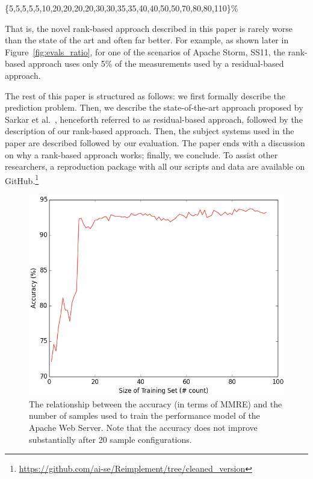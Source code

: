 \begin{center}
\{5,5,5,5,5,10,20,20,20,20,30,30,35,35,40,40,50,50,70,80,80,110\}\%
\end{center}

\noindent
That is, the novel rank-based approach described in this paper is rarely worse than the  state of the art and often far better. For example, as shown later in Figure~\ref{fig:evals_ratio}, for one of the scenarios of Apache Storm, SS11, the rank-based approach uses only 5\% of the measurements used by a residual-based approach.

The rest of this paper is structured as follows: we first formally describe the prediction problem. Then, we describe the state-of-the-art approach proposed by Sarkar et al.~\cite{sarkar2015cost}, henceforth referred to as residual-based approach, followed by the description of our rank-based approach. Then, the subject systems used in the paper are described followed by our evaluation. The paper ends with a discussion on why a rank-based approach works; finally, we conclude.
To assist other researchers, a reproduction package with all our scripts and data are available
on GitHub.\footnote{
\url{https://github.com/ai-se/Reimplement/tree/cleaned_version}
}


\begin{figure}[t]
\centering
\includegraphics[scale=0.23]{Figures/figure3}
\caption{{\small The relationship between the accuracy (in terms of MMRE) and the number of samples used to train the performance model of the Apache Web Server. Note that the accuracy does not improve substantially after 20 sample configurations.}
}
\label{fig:learning_curve}
\end{figure}

